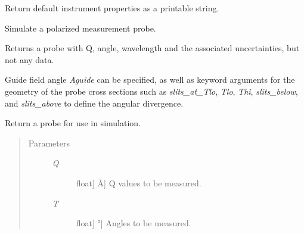 \documentclass[letterpaper,10pt,english]{sphinxmanual}
\begin{document}
\begin{fulllineitems}

\begin{fulllineitems}
\label{api/instrument:refl1d.instrument.Monochromatic.defaults}
Return default instrument properties as a printable string.

\end{fulllineitems}


\begin{fulllineitems}
\label{api/instrument:refl1d.instrument.Monochromatic.magnetic_probe}
Simulate a polarized measurement probe.

Returns a probe with Q, angle, wavelength and the associated
uncertainties, but not any data.

Guide field angle \emph{Aguide} can be specified, as well as keyword
arguments for the geometry of the probe cross sections such as
\emph{slits\_at\_Tlo}, \emph{Tlo}, \emph{Thi}, \emph{slits\_below}, and \emph{slits\_above}
to define the angular divergence.

\end{fulllineitems}


\begin{fulllineitems}
\label{api/instrument:refl1d.instrument.Monochromatic.probe}
Return a probe for use in simulation.
\begin{quote}\begin{description}
\item[{Parameters }] \leavevmode\begin{description}
\item[{\emph{Q}}] \leavevmode{[}{[}float{]} \textbar{} Å{]}
Q values to be measured.

\item[{\emph{T}}] \leavevmode{[}{[}float{]} \textbar{} °{]}
Angles to be measured.

\end{description}

\end{description}\end{quote}


\end{fulllineitems}
\end{fulllineitems}
\end{document}
